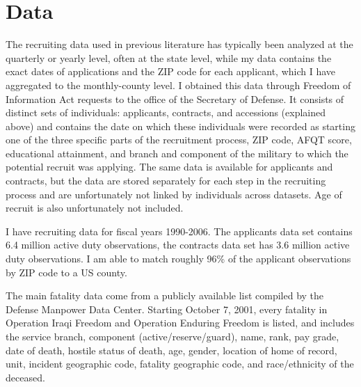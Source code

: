 \documentclass[12pt] {article}
\begin{document}

\section{Data\label{sec:Data}}

The recruiting data used in previous literature has typically been analyzed at the quarterly or yearly level, often at the state level, while my data contains the exact dates of applications and the ZIP code for each applicant, which I have aggregated to the monthly-county level. I obtained this data through Freedom
of Information Act requests to the office of the Secretary of Defense. It consists of distinct sets of individuals: applicants, contracts,
and accessions (explained above) and contains the date on which these individuals were recorded as starting one of the three
specific parts of the recruitment process, ZIP code, AFQT score, educational
attainment, and branch and component of the military to which the
potential recruit was applying. The same data is available for applicants
and contracts, but the data are stored separately for each step in
the recruiting process and are unfortunately not linked by individuals
across datasets. Age of recruit is also unfortunately not included.

I have recruiting data for fiscal years 1990-2006. The applicants data set
contains 6.4 million active duty observations, the contracts data
set has 3.6 million active duty observations. I am able to match roughly 96\% of the applicant observations by ZIP code to a US county.


The main fatality data come from a publicly available list compiled by the Defense Manpower Data Center. Starting October 7, 2001, every fatality in Operation Iraqi Freedom
and Operation Enduring Freedom is listed, and includes the service branch, component (active/reserve/guard), name, rank,
pay grade, date of death, hostile status of death, age, gender, location of home of record, unit, incident geographic code, fatality geographic code, and race/ethnicity of the deceased.
\end{document}

